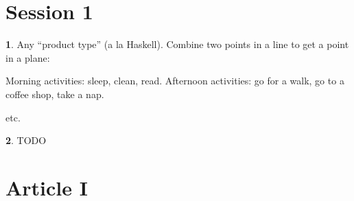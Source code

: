 \documentclass{article}
\theoremstyle{definition}
\theoremstyle{definition}
\theoremstyle{definition}
\newtheorem{solution-internal}{}[subsection]
\newenvironment{solution}{
  \begin{solution-internal}
}{
  \end{solution-internal}
}
\begin{document}
\section*{Session 1}
\setcounter{section}{1}
\setcounter{subsection}{1}

\begin{solution}
Any ``product type'' (a la Haskell).
Combine two points in a line to get a point in a plane:
\begin{center}
\end{center}

Morning activities: sleep, clean, read.
Afternoon activities: go for a walk, go to a coffee shop, take a nap.
\begin{center}
\end{center}
etc.

\end{solution}

\begin{solution}
TODO 
\end{solution}

\section*{Article I}
\renewcommand{\thesection}{\Roman{section}} 
\renewcommand{\thesubsection}{\Roman{subsection}} 
\setcounter{solution-internal}{0}
\end{document}
